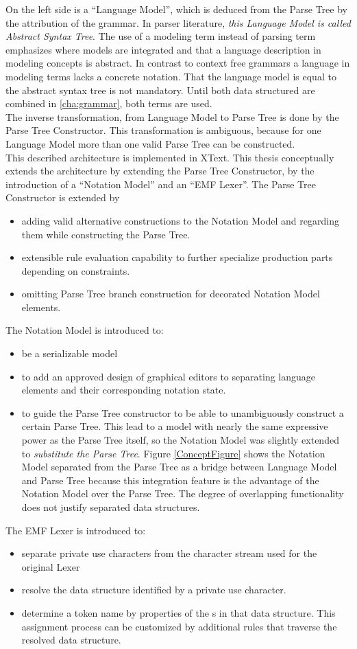On the left side is a ``Language Model'', which is deduced from the Parse Tree by the attribution of the grammar. In parser literature, \emph{this Language Model is called Abstract Syntax Tree}. The use of a modeling term instead of parsing term emphasizes where models are integrated and that a language description in modeling concepts is abstract. In contrast to context free grammars a language in modeling terms lacks a concrete notation. That the language model is equal to the abstract syntax tree is not mandatory. Until both data structured are combined in \ref{cha:grammar}, both terms are used. \\
The inverse transformation, from Language Model to Parse Tree is done by the Parse Tree Constructor. This transformation is ambiguous, because for one Language Model more than one valid Parse Tree can be constructed. \\
This described architecture is implemented in XText. This thesis conceptually extends the architecture by extending the Parse Tree Constructor, by the introduction of a ``Notation Model'' and an ``EMF Lexer''.
The Parse Tree Constructor is extended by 
\begin{itemize}
	\item adding valid alternative constructions to the Notation Model and regarding them while constructing the Parse Tree. 
	\item extensible rule evaluation capability to further specialize production parts depending on constraints.
	\item omitting Parse Tree branch construction for decorated Notation Model elements.
\end{itemize}
The Notation Model is introduced to:
\begin{itemize}
	\item be a serializable model
	\item to add an approved design of graphical editors to separating language elements and their corresponding notation state.
	\item to guide the Parse Tree constructor to be able to unambiguously construct a certain Parse Tree. This lead to a model with nearly the same expressive power as the Parse Tree itself, so the Notation Model was slightly extended to \emph{substitute the Parse Tree}. Figure \ref{ConceptFigure} shows the Notation Model separated from the Parse Tree as a bridge between Language Model and Parse Tree because this integration feature is the advantage of the Notation Model over the Parse Tree. The degree of overlapping functionality does not justify separated data structures.
\end{itemize} 
The EMF Lexer is introduced to:
\begin{itemize}
	\item separate private use characters from the character stream used for the original Lexer
	\item resolve the data structure identified by a private use character.
	\item determine a token name by properties of the s in that data structure. This assignment process can be customized by additional rules that traverse the resolved data structure.
\end{itemize}


